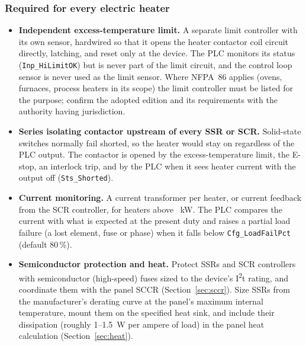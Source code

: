 \subsubsection*{Required for every electric heater}
\begin{itemize}[itemsep=2pt]
  \item \textbf{Independent excess-temperature limit.} A separate limit controller with its own sensor, hardwired so that it opens the heater contactor coil circuit directly, latching, and reset only at the device. The PLC monitors its status (\texttt{Inp\_HiLimitOK}) but is never part of the limit circuit, and the control loop sensor is never used as the limit sensor. Where NFPA~86 applies (ovens, furnaces, process heaters in its scope) the limit controller must be listed for the purpose; confirm the adopted edition and its requirements with the authority having jurisdiction.
  \item \textbf{Series isolating contactor upstream of every SSR or SCR.} Solid-state switches normally fail shorted, so the heater would stay on regardless of the PLC output. The contactor is opened by the excess-temperature limit, the E-stop, an interlock trip, and by the PLC when it sees heater current with the output off (\texttt{Sts\_Shorted}).
  \item \textbf{Current monitoring.} A current transformer per heater, or current feedback from the SCR controller, for heaters above \tbd~kW. The PLC compares the current with what is expected at the present duty and raises a partial load failure (a lost element, fuse or phase) when it falls below \texttt{Cfg\_LoadFailPct} (default 80\,\%).
  \item \textbf{Semiconductor protection and heat.} Protect SSRs and SCR controllers with semiconductor (high-speed) fuses sized to the device's I\textsuperscript{2}t rating, and coordinate them with the panel SCCR (Section~\ref{sec:sccr}). Size SSRs from the manufacturer's derating curve at the panel's maximum internal temperature, mount them on the specified heat sink, and include their dissipation (roughly 1--1.5~W per ampere of load) in the panel heat calculation (Section~\ref{sec:heat}).
\end{itemize}

